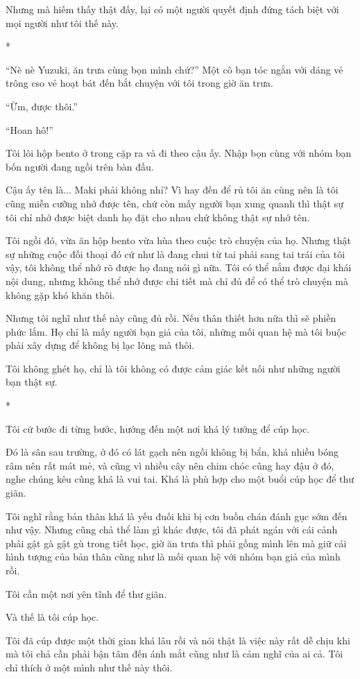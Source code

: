 {Nhưng mà hiếm thấy thật đấy, lại có một người quyết định đứng tách biệt
với mọi người như tôi thế này.

*

``Nè nè Yuzuki, ăn trưa cùng bọn mình chứ?'' Một cô bạn tóc ngắn với
dáng vẻ trông cso vẻ hoạt bát đến bắt chuyện với tôi trong giờ ăn trưa.

``Ừm, được thôi.''

``Hoan hô!''

Tôi lôi hộp bento ở trong cặp ra và đi theo cậu ấy. Nhập bọn cùng với
nhóm bạn bốn người đang ngồi trên bàn đầu.

Cậu ấy tên là... Maki phải không nhỉ? Vì hay đến để rủ tôi ăn cùng nên
là tôi cũng miễn cưỡng nhớ được tên, chứ còn mấy người bạn xung quanh
thì thật sự tôi chỉ nhớ được biệt danh họ đặt cho nhau chứ không thật sự
nhớ tên.

Tôi ngồi đó, vừa ăn hộp bento vừa hùa theo cuộc trò chuyện của họ. Nhưng
thật sự những cuộc đối thoại đó cứ như là đang chui từ tai phải sang tai
trái của tôi vậy, tôi không thể nhớ rõ được họ đang nói gì nữa. Tôi có
thể nắm được đại khái nội dung, nhưng không thể nhớ được chi tiết mà chỉ
đủ để có thể trò chuyện mà không gặp khó khăn thôi.

Nhưng tôi nghĩ như thế này cũng đủ rồi. Nếu thân thiết hơn nữa thì sẽ
phiền phức lắm. Họ chỉ là mấy người bạn giả của tôi, những mối quan hệ
mà tôi buộc phải xây dựng để không bị lạc lõng mà thôi.

Tôi không ghét họ, chỉ là tôi không có được cảm giác kết nối như những
người bạn thật sự.

*

Tôi cứ bước đi từng bước, hướng đến một nơi khá lý tưởng để cúp học.

Đó là sân sau trường, ở đó có lát gạch nên ngồi không bị bẩn, khá nhiều
bóng râm nên rất mát mẻ, và cũng vì nhiều cây nên chim chóc cũng hay đậu
ở đó, nghe chúng kêu cũng khá là vui tai. Khá là phù hợp cho một buổi
cúp học để thư giãn.

Tôi nghĩ rằng bản thân khá là yếu đuối khi bị cơn buồn chán đánh gục sớm
đến như vậy. Nhưng cũng chả thể làm gì khác được, tôi đã phát ngán với
cái cảnh phải gật gà gật gù trong tiết học, giờ ăn trưa thì phải gồng
mình lên mà giữ cái hình tượng của bản thân cũng như là mối quan hệ với
nhóm bạn giả của mình rồi.

Tôi cần một nơi yên tĩnh để thư giãn.

Và thế là tôi cúp học.

Tôi đã cúp được một thời gian khá lâu rồi và nói thật là việc này rất dễ
chịu khi mà tôi chả cần phải bận tâm đến ánh mắt cũng như là cảm nghĩ
của ai cả. Tôi chỉ thích ở một mình như thế này thôi.

}
